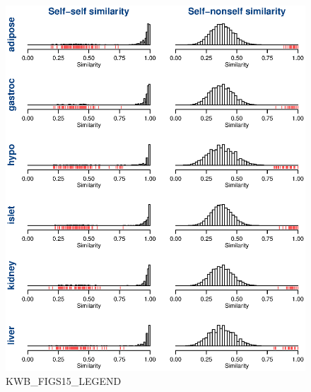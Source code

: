 \documentclass[letterpaper,twoside]{article}
\begin{document}
\begin{figure}[p]
\centerline{\includegraphics{SuppFigs/figS15.eps}}

\caption{KWB_FIGS15_LEGEND}
\end{figure}
\end{document}

